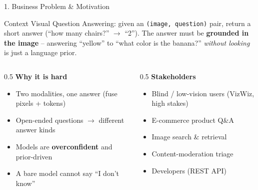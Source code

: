 \documentclass[10pt,aspectratio=169]{beamer}
\begin{document}
\begin{frame}{1. Business Problem \& Motivation}
\begin{block}{Context}
Visual Question Answering: given an \texttt{(image, question)} pair, return a short answer (``how many chairs?'' $\rightarrow$ ``2''). The answer must be \textbf{grounded in the image} -- answering ``yellow'' to ``what color is the banana?'' \emph{without looking} is just a language prior.
\end{block}

\begin{columns}[T]
\begin{column}{0.5\textwidth}
\textbf{Why it is hard}
\begin{itemize}\small
  \item Two modalities, one answer (fuse pixels + tokens)
  \item Open-ended questions $\rightarrow$ different answer kinds
  \item Models are \textbf{overconfident} and prior-driven
  \item A bare model cannot say ``I don't know''
\end{itemize}
\end{column}
\begin{column}{0.5\textwidth}
\textbf{Stakeholders}
\begin{itemize}\small
  \item Blind / low-vision users (VizWiz, high stakes)
  \item E-commerce product Q\&A
  \item Image search \& retrieval
  \item Content-moderation triage
  \item Developers (REST API)
\end{itemize}
\end{column}
\end{columns}
\end{frame}
\end{document}
